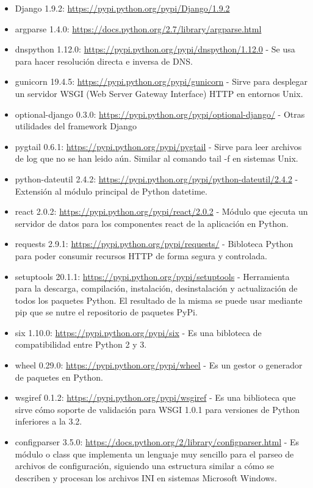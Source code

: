 \begin{itemize}
  \item Django 1.9.2: \url{https://pypi.python.org/pypi/Django/1.9.2}
  \item argparse 1.4.0: \url{https://docs.python.org/2.7/library/argparse.html}
  \item dnspython 1.12.0: \url{https://pypi.python.org/pypi/dnspython/1.12.0} - Se usa para hacer resolución directa e inversa de DNS.
  \item gunicorn 19.4.5: \url{https://pypi.python.org/pypi/gunicorn} - Sirve para desplegar un servidor WSGI (Web Server Gateway Interface) HTTP en entornos Unix.
  \item optional-django 0.3.0: \url{https://pypi.python.org/pypi/optional-django/} - Otras utilidades del framework Django
  \item pygtail 0.6.1: \url{https://pypi.python.org/pypi/pygtail} - Sirve para leer archivos de log que no se han leido aún. Similar al comando tail -f en sistemas Unix.
  \item python-dateutil 2.4.2: \url{https://pypi.python.org/pypi/python-dateutil/2.4.2} - Extensión al módulo principal de Python datetime.
  \item react 2.0.2: \url{https://pypi.python.org/pypi/react/2.0.2} - Módulo que ejecuta un servidor de datos para los componentes react de la aplicación en Python.
  \item requests 2.9.1: \url{https://pypi.python.org/pypi/requests/} - Bibloteca Python para poder consumir recursos HTTP de forma segura y controlada.
  \item setuptools 20.1.1: \url{https://pypi.python.org/pypi/setuptools} - Herramienta para la descarga, compilación, instalación, desinstalación y actualización de todos los paquetes Python. El resultado de la misma se puede usar mediante pip que se nutre el repositorio de paquetes PyPi.
  \item six 1.10.0: \url{https://pypi.python.org/pypi/six} - Es una bibloteca de compatibilidad entre Python 2 y 3.
  \item wheel 0.29.0: \url{https://pypi.python.org/pypi/wheel} - Es un gestor o generador de paquetes en Python.
  \item wsgiref 0.1.2: \url{https://pypi.python.org/pypi/wsgiref} - Es una biblioteca que sirve cómo soporte de validación para WSGI 1.0.1 para versiones de Python inferiores a la 3.2.
  \item configparser 3.5.0: \url{https://docs.python.org/2/library/configparser.html} - Es módulo o class que implementa un lenguaje muy sencillo para el parseo de archivos de configuración, siguiendo una estructura similar a cómo se describen y procesan los archivos INI en sistemas Microsoft Windows.
\end{itemize}


